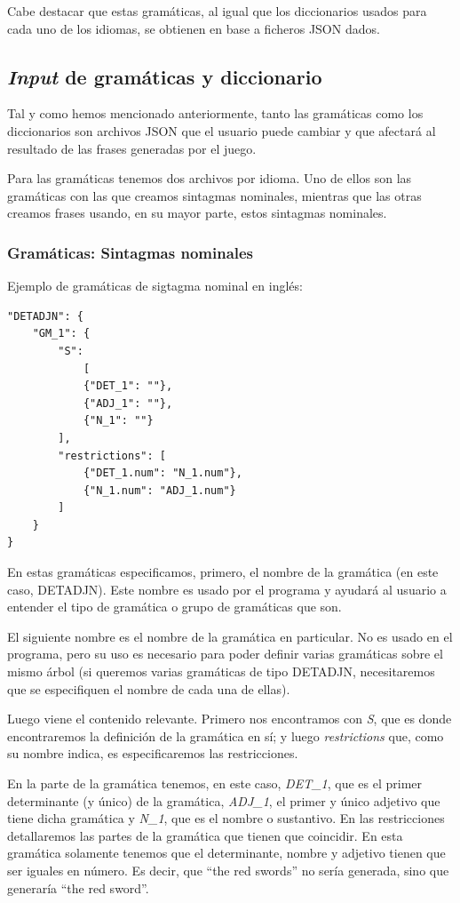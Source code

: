 Cabe destacar que estas gramáticas, al igual que los diccionarios usados para cada uno de los idiomas, se obtienen en base a ficheros JSON dados.

\subsection{\textit{Input} de gramáticas y diccionario}

Tal y como hemos mencionado anteriormente, tanto las gramáticas como los diccionarios son archivos JSON que el usuario puede cambiar y que afectará al resultado de las frases generadas por el juego.

Para las gramáticas tenemos dos archivos por idioma. Uno de ellos son las gramáticas con las que creamos sintagmas nominales, mientras que las otras creamos frases usando, en su mayor parte, estos sintagmas nominales.

\subsubsection{Gramáticas: Sintagmas nominales}

Ejemplo de gramáticas de sigtagma nominal en inglés:

\begin{lstlisting}[style=json]
"DETADJN": {
    "GM_1": {
        "S": 
            [
            {"DET_1": ""}, 
            {"ADJ_1": ""}, 
            {"N_1": ""}
        ],
        "restrictions": [
            {"DET_1.num": "N_1.num"},
            {"N_1.num": "ADJ_1.num"}
        ]
    }
}
\end{lstlisting}

En estas gramáticas especificamos, primero, el nombre de la gramática (en este caso, DETADJN). Este nombre es usado por el programa y ayudará al usuario a entender el tipo de gramática o grupo de gramáticas que son.

El siguiente nombre es el nombre de la gramática en particular. No es usado en el programa, pero su uso es necesario para poder definir varias gramáticas sobre el mismo árbol (si queremos varias gramáticas de tipo DETADJN, necesitaremos que se especifiquen el nombre de cada una de ellas).

Luego viene el contenido relevante. Primero nos encontramos con \textit{S}, que es donde encontraremos la definición de la gramática en sí; y luego \textit{restrictions} que, como su nombre indica, es especificaremos las restricciones.

En la parte de la gramática tenemos, en este caso, \textit{DET\_1}, que es el primer determinante (y único) de la gramática, \textit{ADJ\_1}, el primer y único adjetivo que tiene dicha gramática y \textit{N\_1}, que es el nombre o sustantivo.
En las restricciones detallaremos las partes de la gramática que tienen que coincidir. En esta gramática solamente tenemos que el determinante, nombre y adjetivo tienen que ser iguales en número. Es decir, que ``the red swords'' no sería generada, sino que generaría ``the red sword''.

